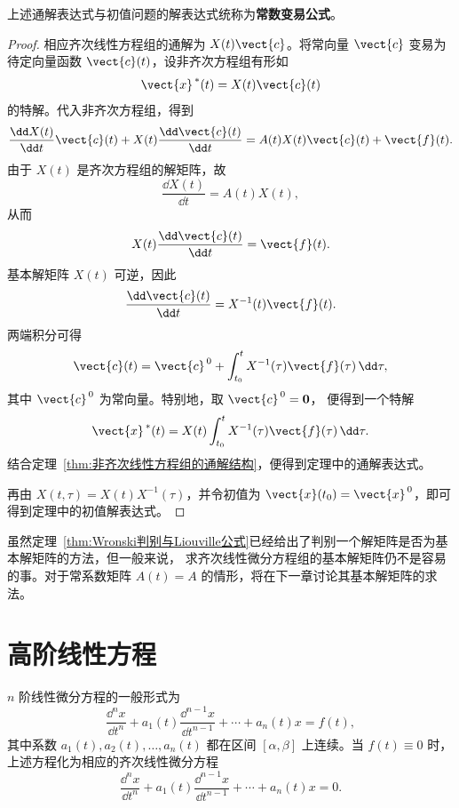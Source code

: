 上述通解表达式与初值问题的解表达式统称为\textbf{常数变易公式}。

\begin{proof}
	相应齐次线性方程组的通解为 $X(t)\vect{c}$。将常向量 $\vect{c}$ 变易为
	待定向量函数 $\vect{c}(t)$，设非齐次方程组有形如
	\[
		\vect{x}^{\,*}(t)=X(t)\vect{c}(t)
	\]
	的特解。代入非齐次方程组，得到
	\[
		\dfrac{\dd X(t)}{\dd t}\vect{c}(t)
		+X(t)\dfrac{\dd\vect{c}(t)}{\dd t}
		=A(t)X(t)\vect{c}(t)+\vect{f}(t).
	\]
	由于 $X(t)$ 是齐次方程组的解矩阵，故
	\[
		\dfrac{\dd X(t)}{\dd t}=A(t)X(t),
	\]
	从而
	\[
		X(t)\dfrac{\dd\vect{c}(t)}{\dd t}=\vect{f}(t).
	\]
	基本解矩阵 $X(t)$ 可逆，因此
	\[
		\dfrac{\dd\vect{c}(t)}{\dd t}=X^{-1}(t)\vect{f}(t).
	\]
	两端积分可得
	\[
		\vect{c}(t)
		=\vect{c}^{\,0}
		+\int_{t_0}^{t}X^{-1}(\tau)\vect{f}(\tau)\,\dd\tau,
	\]
	其中 $\vect{c}^{\,0}$ 为常向量。特别地，取 $\vect{c}^{\,0}=\boldsymbol{0}$，
	便得到一个特解
	\[
		\vect{x}^{\,*}(t)
		=X(t)\int_{t_0}^{t}X^{-1}(\tau)\vect{f}(\tau)\,\dd\tau.
	\]
	结合定理~\ref{thm:非齐次线性方程组的通解结构}，便得到定理中的通解表达式。

	再由 $X(t,\tau)=X(t)X^{-1}(\tau)$，并令初值为
	$\vect{x}(t_0)=\vect{x}^{\,0}$，即可得到定理中的初值解表达式。
\end{proof}

虽然定理~\ref{thm:Wronski判别与Liouville公式}已经给出了判别一个解矩阵是否为基本解矩阵的方法，但一般来说，
求齐次线性微分方程组的基本解矩阵仍不是容易的事。对于常系数矩阵
$A(t)=A$ 的情形，将在下一章讨论其基本解矩阵的求法。

\section{高阶线性方程}\label{sec:高阶线性方程}

$n$ 阶线性微分方程的一般形式为
\[
	\dfrac{\dd^n x}{\dd t^n}
	+a_1(t)\dfrac{\dd^{n-1}x}{\dd t^{n-1}}
	+\cdots+a_n(t)x=f(t),
\]
其中系数 $a_1(t),a_2(t),\ldots,a_n(t)$ 都在区间
$[\alpha,\beta]$ 上连续。当 $f(t)\equiv 0$ 时，
上述方程化为相应的齐次线性微分方程
\[
	\dfrac{\dd^n x}{\dd t^n}
	+a_1(t)\dfrac{\dd^{n-1}x}{\dd t^{n-1}}
	+\cdots+a_n(t)x=0.
\]

